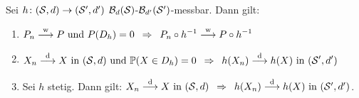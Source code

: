 \begin{satz} \label{satz: 4.10ContinuousMappingTheorem}
	Sei $h \colon (\S,d) \to (\S',d')$ $\B_d(\S)$-$\B_{d'}(\S')$-messbar.
	Dann gilt:
	\begin{enumerate}[label=(\arabic*)]
		\item \label{it:4.10CMTweakto} $\begin{aligned}
			P_n \weakto  P \und P(D_h) = 0
			\follows P_n \circ h^{-1} \weakto P \circ h^{-1}
		\end{aligned}$
	\item \label{it:4.10CMTdistrto} $\begin{aligned}
			X_n \distto X \text{ in }(\S,d) \und \P(X \in D_h) = 0
			\follows h(X_n) \distto h(X)\text{ in } (\S',d')
		\end{aligned}$
	\item \label{it:4.10CMThcontinous} Sei $h$ stetig. Dann gilt: $X_n \distto X \text{ in } (\S,d) \follows h(X_n) \distto h(X) \text{ in } (\S',d')$.
	\end{enumerate}
\end{satz}

